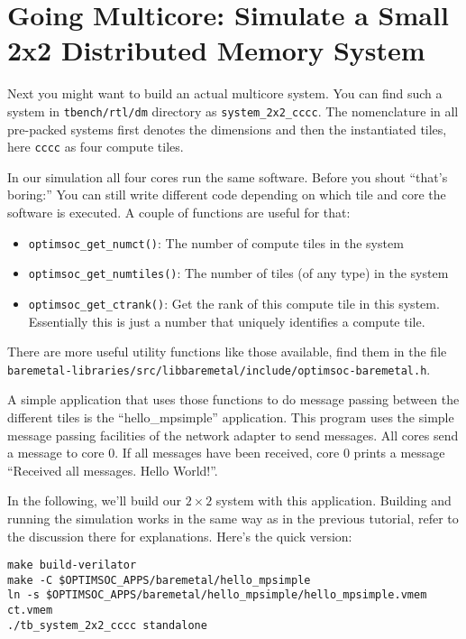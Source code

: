 \section{Going Multicore: Simulate a Small 2x2 Distributed Memory
  System}

Next you might want to build an actual multicore system. You can find
such a system in \verb|tbench/rtl/dm| directory as
\verb|system_2x2_cccc|. The nomenclature in all pre-packed systems
first denotes the dimensions and then the instantiated tiles, here
\verb|cccc| as four compute tiles.

In our simulation all four cores run the same software. Before you shout
``that's boring:'' You can still write different code depending on which tile
and core the software is executed. A couple of functions are useful for that:

\begin{itemize}
  \item \verb|optimsoc_get_numct()|: The number of compute tiles in the system
  \item \verb|optimsoc_get_numtiles()|: The number of tiles (of any type) in
    the system
  \item \verb|optimsoc_get_ctrank()|: Get the rank of this compute tile in this
    system. Essentially this is just a number that uniquely identifies a
    compute tile.
\end{itemize}

There are more useful utility functions like those available, find them in the
file \verb|baremetal-libraries/src/libbaremetal/include/optimsoc-baremetal.h|.

A simple application that uses those functions to do message passing between
the different tiles is the ``hello\_mpsimple'' application. This program uses
the simple message passing facilities of the network adapter to send messages.
All cores send a message to core 0. If all messages have been received, core 0
prints a message ``Received all messages. Hello World!''.

In the following, we'll build our $2 \times 2$ system with this application.
Building and running the simulation works in the same way as in the previous
tutorial, refer to the discussion there for explanations. Here's the quick
version:

\begin{lstlisting}
make build-verilator
make -C $OPTIMSOC_APPS/baremetal/hello_mpsimple
ln -s $OPTIMSOC_APPS/baremetal/hello_mpsimple/hello_mpsimple.vmem ct.vmem
./tb_system_2x2_cccc standalone
\end{lstlisting}

